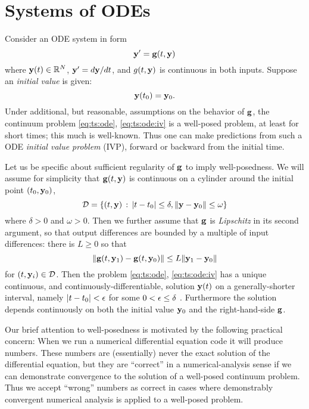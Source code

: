 \section{Systems of ODEs}  Consider an ODE system in form
\begin{equation}
\mathbf{y}' = \mathbf{g}(t,\mathbf{y})  \label{eq:ts:ode}
\end{equation}
where $\mathbf{y}(t) \in \mathbb{R}^N$, $\mathbf{y}'=d\mathbf{y}/dt$, and $g(t,\mathbf{y})$ is continuous in both inputs.  Suppose an \emph{initial value} is given:
\begin{equation}
\mathbf{y}(t_0) = \mathbf{y}_0.  \label{eq:ts:ode:iv}
\end{equation}
Under additional, but reasonable, assumptions on the behavior of $\mathbf{g}$, the continuum problem \eqref{eq:ts:ode}, \eqref{eq:ts:ode:iv} is a well-posed problem, at least for short times; this much is well-known.  Thus one can make predictions from such a ODE \emph{initial value problem} (IVP), forward or backward from the initial time.

Let us be specific about sufficient regularity of $\mathbf{g}$ to imply well-posedness.  We will assume for simplicity that $\mathbf{g}(t,\mathbf{y})$ is continuous on a cylinder around the initial point $(t_0,\mathbf{y}_0)$,
   $$\mathcal{D} = \{(t,\mathbf{y}) \,:\, |t-t_0| \le \delta, \|\mathbf{y} - \mathbf{y}_0\| \le \omega\}$$
where $\delta > 0$ and $\omega > 0$.  Then we further assume that $\mathbf{g}$ is \emph{Lipschitz} in its second argument, so that output differences are bounded by a multiple of input differences: there is $L\ge 0$ so that
\begin{equation}
\|\mathbf{g}(t,\mathbf{y}_1) - \mathbf{g}(t,\mathbf{y}_0)\| \le L \|\mathbf{y}_1-\mathbf{y}_0\|  \label{eq:ts:glipschitz}
\end{equation}
for $(t,\mathbf{y}_i) \in \mathcal{D}$.  Then the problem \eqref{eq:ts:ode}, \eqref{eq:ts:ode:iv} has a unique continuous, and continuously-differentiable, solution $\mathbf{y}(t)$ on a generally-shorter interval, namely $|t-t_0|<\epsilon$ for some $0 < \epsilon \le \delta$ \citep[section 17.5]{HirschSmaleDevaney2004}.  Furthermore the solution depends continuously on both the initial value $\mathbf{y}_0$ and the right-hand-side $\mathbf{g}$.

Our brief attention to well-posedness is motivated by the following practical concern:  When we run a numerical differential equation code it will produce numbers.  These numbers are (essentially) never the exact solution of the differential equation, but they are ``correct'' in a numerical-analysis sense if we can demonstrate convergence to the solution of a well-posed continuum problem.  Thus we accept ``wrong'' numbers as correct in cases where demonstrably convergent numerical analysis is applied to a well-posed problem.

